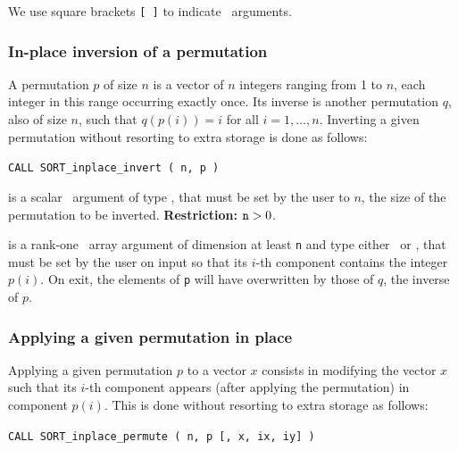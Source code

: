 \documentclass{galahad}
\newcommand{\packagename}{SORT}
\begin{document}
\noindent
We use square brackets {\tt [ ]} to indicate \optional\ arguments.

\subsubsection{In-place inversion of a permutation}

A permutation $p$ of size $n$ is a vector of $n$ integers ranging from 1 to $n$,
each integer in this range occurring exactly once. Its inverse is another
permutation $q$, also of size $n$, such that $q(p(i))=i$ for all $i=1,\ldots,n$.
Inverting a given permutation without resorting to extra storage is done as
follows:
\vspace*{1mm}

\hspace{8mm}
{\tt CALL \packagename\_inplace\_invert ( n, p )}

\vspace*{-3mm}
\begin{description}
 is a scalar \intentin\ argument of type 
\integer, that must be set by the user to $n$, the size of the permutation to
be inverted.
{\bf Restriction:} ${\tt n} > 0$.

 is a rank-one \intentinout\ array argument of
dimension at least {\tt n} and type either 
\integer\ or \realdp, that must be set by the user
on input so that its $i$-th component contains the integer $p(i)$.
On exit, the elements of {\tt p} will have overwritten by those of $q$, the
inverse of $p$.

\end{description}

\subsubsection{Applying a given permutation in place}

Applying a given permutation $p$ to a vector $x$ consists in modifying the
vector $x$ such that its $i$-th component appears (after applying the
permutation) in component $p(i)$.
This is done without resorting to extra storage as follows:
\vspace*{1mm}

{\tt CALL \packagename\_inplace\_permute ( n, p [, x, ix, iy] )}
\end{document}
